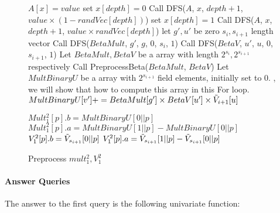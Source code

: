 {\begin{figure}[p]
\begin{algorithm}[H]
\label{alg::parttwo}
\caption{Preprocess $mult_1^2, V_1^2$}
\begin{algorithmic}[1]
		\State $A[x]=value$
	\Else
		\State set $x[depth]=0$
		\State Call DFS($A$, $x$, $depth + 1$, $value \times (1-randVec[depth])$)
		\State set $x[depth]=1$
		\State Call DFS($A$, $x$, $depth + 1$, $value \times randVec[depth]$)
	\EndIf
\EndProcedure
{}
	\State let $g', u'$ be zero $s_{i}, s_{i+1}$ length vector
	\State Call {\sf DFS}($BetaMult$, $g'$, $g$, $0$, $s_{i}$, $1$)
	\State Call {\sf DFS}($BetaV$, $u'$, $u$, $0$, $s_{i + 1}$, $1$)
\EndProcedure
{}
	\State Let $BetaMult, BetaV$ be a array with length $2^{s_{i}}, 2^{s_{i+1}}$ respectively
	\State Call {\sf PreprocessBeta}($BetaMult$, $BetaV$)
	\State Let $MultBinaryU$ be a array with $2^{s_{i+1}}$ field elements, initially set to $0$.
	, we will show that how to compute this array in this For loop.
			\State $MultBinaryU[v'] += BetaMult[g'] \times BetaV[u'] \times \tilde{V}_{i+1}[u]$
		\EndFor
	\EndFor

		\State $Mult_1^2[p].b = MultBinaryU[0||p]$
		\State $Mult_1^2[p].a = MultBinaryU[1||p]-MultBinaryU[0||p]$
		\State $V_1^2[p].b = \tilde{V}_{s_{i+1}}[0||p]$
		\State $V_1^2[p].a = \tilde{V}_{s_{i+1}}[1||p]-\tilde{V}_{s_{i+1}}[0||p]$
	\EndFor
\EndProcedure
\end{algorithmic}
\end{algorithm}
\end{figure}

\paragraph*{Answer Queries}
The answer to the first query is the following univariate function:

}
